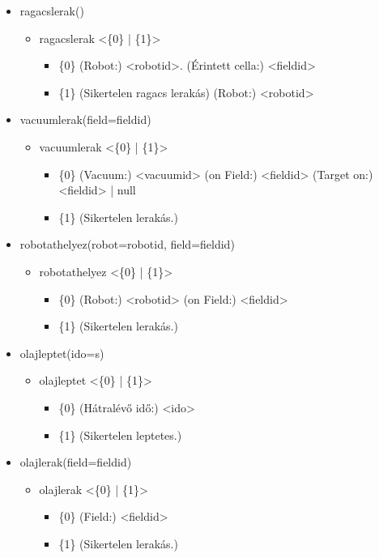 \begin{itemize}
	\item ragacslerak()
	\begin{itemize}
		\item ragacslerak  <\{0\} | \{1\}>
		\begin{itemize}
			\item \{0\} (Robot:) <robotid>. (Érintett cella:) <fieldid>
			\item \{1\} (Sikertelen ragacs lerakás) (Robot:) <robotid>
		\end{itemize}
	\end{itemize}	
	
	\item vacuumlerak(field=fieldid)
	\begin{itemize}
		\item vacuumlerak  <\{0\} | \{1\}>
		\begin{itemize}
			\item \{0\} (Vacuum:) <vacuumid> (on Field:) <fieldid> (Target on:) {<fieldid> | null}
			\item \{1\} (Sikertelen lerakás.)
		\end{itemize}
	\end{itemize}	
	
	\item robotathelyez(robot=robotid, field=fieldid)
	\begin{itemize}
		\item robotathelyez  <\{0\} | \{1\}>
		\begin{itemize}
			\item \{0\} (Robot:) <robotid> (on Field:) <fieldid> 
			\item \{1\} (Sikertelen lerakás.)
		\end{itemize}
	\end{itemize}	
	
	\item olajleptet(ido=s)
	\begin{itemize}
		\item olajleptet  <\{0\} | \{1\}>
		\begin{itemize}
			\item \{0\} (Hátralévő idő:) <ido> 
			\item \{1\} (Sikertelen leptetes.)
		\end{itemize}
	\end{itemize}	
	
	\item olajlerak(field=fieldid)
	\begin{itemize}
		\item olajlerak  <\{0\} | \{1\}>
		\begin{itemize}
			\item \{0\} (Field:) <fieldid> 
			\item \{1\} (Sikertelen lerakás.)
		\end{itemize}
	\end{itemize}	
	

\end{itemize}
